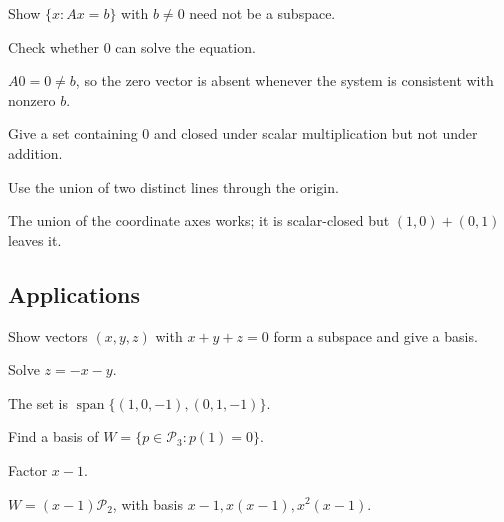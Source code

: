 \begin{exercise}\label{exr:i02-expand-11}
Show \(\{x:Ax=b\}\) with \(b\neq0\) need not be a subspace.
\end{exercise}
\begin{hint}
Check whether \(0\) can solve the equation.
\end{hint}
\begin{solution}
\(A0=0\neq b\), so the zero vector is absent whenever the system is consistent with nonzero \(b\).
\end{solution}

\begin{exercise}\label{exr:i02-expand-12}
Give a set containing \(0\) and closed under scalar multiplication but not under addition.
\end{exercise}
\begin{hint}
Use the union of two distinct lines through the origin.
\end{hint}
\begin{solution}
The union of the coordinate axes works; it is scalar-closed but \((1,0)+(0,1)\) leaves it.
\end{solution}

\subsection*{Applications}

\begin{exercise}\label{exr:i02-expand-13}
Show vectors \((x,y,z)\) with \(x+y+z=0\) form a subspace and give a basis.
\end{exercise}
\begin{hint}
Solve \(z=-x-y\).
\end{hint}
\begin{solution}
The set is \(\operatorname{span}\{(1,0,-1),(0,1,-1)\}\).
\end{solution}

\begin{exercise}\label{exr:i02-expand-14}
Find a basis of \(W=\{p\in\mathcal P_3:p(1)=0\}\).
\end{exercise}
\begin{hint}
Factor \(x-1\).
\end{hint}
\begin{solution}
\(W=(x-1)\mathcal P_2\), with basis \(x-1,x(x-1),x^2(x-1)\).
\end{solution}

